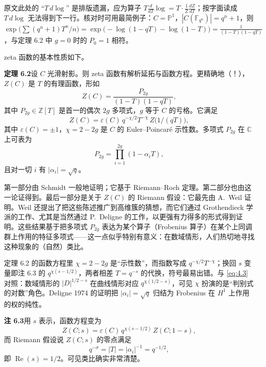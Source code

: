 \begin{annote}
原文此处的 “$T\,d\log$” 是排版遗漏，应为算子 $T\frac{d}{dT}\log=T\cdot\frac{1}{Z}\frac{dZ}{dT}$；按字面读成 $T\,d\log$ 无法得到下一行。核对时可用最简例子：$C=\mathbb{P}^{1}$，$|C(\mathbb{F}_{q^{n}})|=q^{n}+1$，则 $\exp\bigl(\sum(q^{n}+1)T^{n}/n\bigr)=\exp\bigl(-\log(1-qT)-\log(1-T)\bigr)=\frac{1}{(1-T)(1-qT)}$，与定理 6.2 中 $g=0$ 时的 $P_0=1$ 相符。
\par\vspace{0.15em}{\raggedleft 【来源：Weil 1948 “Numbers of solutions of equations in finite fields”（A）；nLab “zeta function of a curve” 条目（B，与 A 交叉）】\par}
\end{annote}

zeta 函数的基本性质如下。

\par\medskip\noindent\textbf{定理 6.2}\quad 设 $C$ 光滑射影。则 zeta 函数有解析延拓与函数方程。更精确地（！），$Z(C)$ 是 $T$ 的有理函数，形如
\[
Z(C)=\frac{P_{2g}}{(1-T)(1-qT)},
\]
其中 $P_{2g}\in\mathbb{Z}[T]$ 是首一的偶次 $2g$ 多项式，$g$ 等于 $C$ 的亏格。它满足
\[
Z(C)=\varepsilon(C)\,q^{-\chi/2}T^{-\chi}\,Z\bigl(1/(qT)\bigr),
\]
其中 $\varepsilon(C)=\pm1$，$\chi=2-2g$ 是 $C$ 的 Euler--Poincaré 示性数。多项式 $P_{2g}$ 在 $\mathbb{C}$ 上可表为
\[
P_{2g}=\prod_{i=1}^{2g}(1-\alpha_iT),
\]
且对一切 $i$ 有 $|\alpha_i|=\sqrt{q}$。

第一部分由 Schmidt 一般地证明；它基于 Riemann--Roch 定理。第二部分也由这一论证得到。最后一部分是关于 $Z(C)$ 的 Riemann 假设：它最先由 A.~Weil 证明。Weil 还提出了把这些陈述推广到高维簇的猜想，而它们通过 Grothendieck 学派的工作、尤其是当然通过 P.~Deligne 的工作，以更强有力得多的形式得到证明。这些结果基于把多项式 $P_{2g}$ 表达为某个算子（Frobenius 算子）在某个上同调群上作用的特征多项式——这一点似乎特别有意义：在数域情形，人们热切地寻找这种现象的（自然）类比。

\begin{annote}
定理 6.2 的函数方程里 $\chi=2-2g$ 是“示性数”，而指数写成 $q^{-\chi/2}T^{-\chi}$；换回 $s$ 变量即注 6.3 的 $q^{\chi(s-1/2)}$，两者相差 $T=q^{-s}$ 的代换，符号最易出错。与 \eqref{eq:4.3} 对照：数域情形的 $|D|^{1/2-s}$ 在曲线情形对应 $q^{\chi(1/2-s)}$，可见 $\chi$ 扮演的是“判别式的对数”角色。Deligne 1974 的证明把 $|\alpha_i|=\sqrt q$ 归结为 Frobenius 在 $H^{1}$ 上作用的权的纯性。
\par\vspace{0.15em}{\raggedleft 【来源：Weil 1948（A）；Deligne 1974 “La conjecture de Weil I”（A）】\par}
\end{annote}

\par\medskip\noindent\textbf{注 6.3}\quad 用 $s$ 表示，函数方程变为
\[
Z(C;s)=\varepsilon(C)\,q^{\chi(s-1/2)}\,Z(C;1-s),
\]
而 Riemann 假设说 $Z(C;s)$ 的零点满足
\[
q^{-\sigma}=|T|=|\alpha_i|^{-1}=q^{-1/2},
\]
即 $\operatorname{Re}(s)=1/2$。可见类比确实非常清楚。
